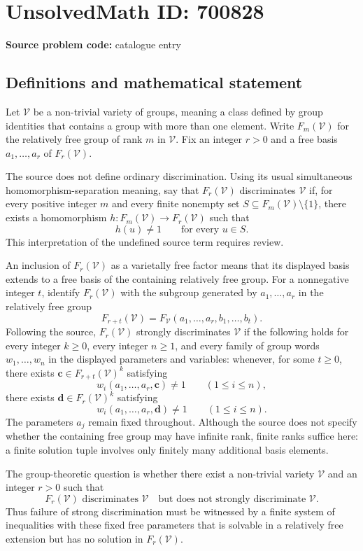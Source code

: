 \documentclass[11pt]{article}
\begin{document}
\section*{UnsolvedMath ID: 700828}
\textbf{Source problem code:} catalogue entry
\subsection{Definitions and mathematical statement}
Let \(\mathcal V\) be a non-trivial variety of groups, meaning a class defined by group identities that contains a group with more than one element. Write \(F_m(\mathcal V)\) for the relatively free group of rank \(m\) in \(\mathcal V\). Fix an integer \(r>0\) and a free basis \(a_1,\ldots,a_r\) of \(F_r(\mathcal V)\).

The source does not define ordinary discrimination. Using its usual simultaneous homomorphism-separation meaning, say that \(F_r(\mathcal V)\) discriminates \(\mathcal V\) if, for every positive integer \(m\) and every finite nonempty set \(S\subseteq F_m(\mathcal V)\setminus\{1\}\), there exists a homomorphism \(h:F_m(\mathcal V)\to F_r(\mathcal V)\) such that
\[
 h(u)\ne1\qquad\text{for every }u\in S.
\]
This interpretation of the undefined source term requires review.

An inclusion of \(F_r(\mathcal V)\) as a varietally free factor means that its displayed basis extends to a free basis of the containing relatively free group. For a nonnegative integer \(t\), identify \(F_r(\mathcal V)\) with the subgroup generated by \(a_1,\ldots,a_r\) in the relatively free group
\[
 F_{r+t}(\mathcal V)=F_{\mathcal V}(a_1,\ldots,a_r,b_1,\ldots,b_t).
\]
Following the source, \(F_r(\mathcal V)\) strongly discriminates \(\mathcal V\) if the following holds for every integer \(k\ge0\), every integer \(n\ge1\), and every family of group words \(w_1,\ldots,w_n\) in the displayed parameters and variables: whenever, for some \(t\ge0\), there exists \(\mathbf c\in F_{r+t}(\mathcal V)^k\) satisfying
\[
 w_i(a_1,\ldots,a_r,\mathbf c)\ne1\qquad(1\le i\le n),
\]
there exists \(\mathbf d\in F_r(\mathcal V)^k\) satisfying
\[
 w_i(a_1,\ldots,a_r,\mathbf d)\ne1\qquad(1\le i\le n).
\]
The parameters \(a_j\) remain fixed throughout. Although the source does not specify whether the containing free group may have infinite rank, finite ranks suffice here: a finite solution tuple involves only finitely many additional basis elements.

The group-theoretic question is whether there exist a non-trivial variety \(\mathcal V\) and an integer \(r>0\) such that
\[
 F_r(\mathcal V)\text{ discriminates }\mathcal V
 \quad\text{but does not strongly discriminate }\mathcal V.
\]
Thus failure of strong discrimination must be witnessed by a finite system of inequalities with these fixed free parameters that is solvable in a relatively free extension but has no solution in \(F_r(\mathcal V)\).
\end{document}
